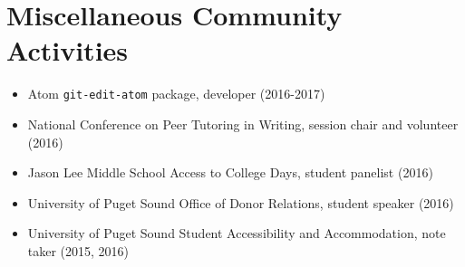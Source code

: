 \section{Miscellaneous Community Activities}
\begin{itemize}
\item Atom \texttt{git-edit-atom} package, developer (2016-2017)
\item National Conference on Peer Tutoring in Writing, session chair and volunteer (2016)
\item Jason Lee Middle School Access to College Days, student panelist (2016)
\item University of Puget Sound Office of Donor Relations, student speaker (2016)
\item University of Puget Sound Student Accessibility and Accommodation, note taker (2015, 2016)
\end{itemize}
\vspace{-3.5mm}
